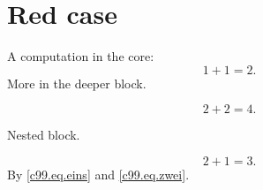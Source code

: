 \chapter{Red case}\label{c99}

A computation in the core:
\begin{equation}\label{c99.eq.eins}
  1 + 1 = 2.
\end{equation}
More in the deeper block.

\begin{vertiefung}[id=c99.v1, titel={Deeper}, wozu={Shows a second computation.},
    voraussetzung={Equation~\eqref{c99.eq.eins}.}, zurueck={It stays at two.}]
  \begin{equation}\label{c99.eq.tief}
    2 + 2 = 4.
  \end{equation}
  \begin{vertiefung}[id=c99.v2, titel={Deeper still}, wozu={Nested.}, voraussetzung={None.}, zurueck={Nothing.}]
    Nested block.
  \end{vertiefung}
\end{vertiefung}

\begin{equation}\label{c99.eq.zwei}
  2 + 1 = 3.
\end{equation}
By \eqref{c99.eq.eins} and \eqref{c99.eq.zwei}.
